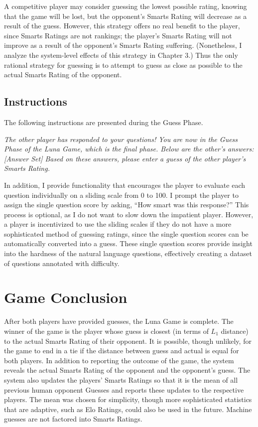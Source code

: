 A competitive player may consider guessing the lowest possible rating, knowing that the game will be lost, but the opponent's Smarts Rating will decrease as a result of the guess. However, this strategy offers no real benefit to the player, since Smarts Ratings are not rankings; the player's Smarts Rating will not improve as a result of the opponent's Smarts Rating suffering. (Nonetheless, I analyze the system-level effects of this strategy in Chapter $3$.) Thus the only rational strategy for guessing is to attempt to guess as close as possible to the actual Smarts Rating of the opponent.

\subsection{Instructions}

The following instructions are presented during the Guess Phase.
\begin{center}
\textit{The other player has responded to your questions! You are now in the Guess Phase of the Luna Game, which is the final phase. Below are the other's answers: [Answer Set] Based on these answers, please enter a guess of the other player's Smarts Rating.}
\end{center}
In addition, I provide functionality that encourages the player to evaluate each question individually on a sliding scale from 0 to 100. I prompt the player to assign the single question score by asking, ``How smart was this response?'' This process is optional, as I do not want to slow down the impatient player. However, a player is incentivized to use the sliding scales if they do not have a more sophisticated method of guessing ratings, since the single question scores can be automatically converted into a guess. These single question scores provide insight into the hardness of the natural language questions, effectively creating a dataset of questions annotated with difficulty.

\section{Game Conclusion}

After both players have provided guesses, the Luna Game is complete. The winner of the game is the player whose guess is closest (in terms of $L_1$ distance) to the actual Smarts Rating of their opponent. It is possible, though unlikely, for the game to end in a tie if the distance between guess and actual is equal for both players. In addition to reporting the outcome of the game, the system reveals the actual Smarts Rating of the opponent and the opponent's guess. The system also updates the players' Smarts Ratings so that it is the mean of all previous human opponent Guesses and reports these updates to the respective players. The mean was chosen for simplicity, though more sophisticated statistics that are adaptive, such as Elo Ratings, could also be used in the future. Machine guesses are not factored into Smarts Ratings.


